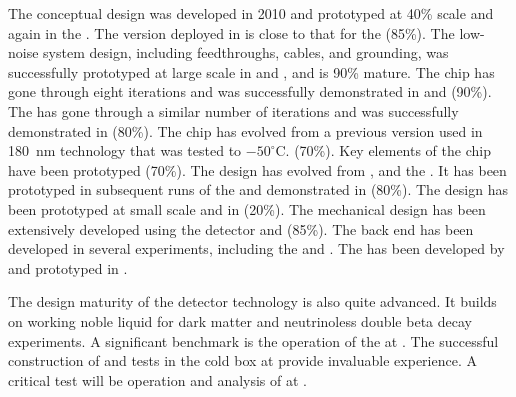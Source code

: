 The  conceptual design was developed in 2010 and prototyped
at 40\% scale and again in the . The version deployed in
 is close to that for the  (85\%). The
 low-noise system design, including feedthroughs, cables, and
grounding, was successfully prototyped at large scale in
 and , and is 90\% mature. The
 chip has gone through eight iterations and was successfully
demonstrated in  and  (90\%). The
 has gone through a similar number of iterations and was
successfully demonstrated in  (80\%). The  chip
has evolved from a previous version used in  180~nm
technology that was tested to $-50^\circ$C. (70\%). Key elements of
the  chip have been prototyped (70\%). The 
design has evolved from ,  and the
.  It has been prototyped in subsequent runs of the
 and demonstrated in  (80\%). The 
 design has been prototyped at small scale and in
 (20\%). The mechanical design has been extensively
developed using the  detector and  (85\%). The
  back end has been developed in several
experiments, including the  and . The
   has been developed by
 and prototyped in .

The design maturity of the  detector technology is also
quite advanced. It builds on working noble liquid  for
dark matter and neutrinoless double beta decay experiments. A
significant benchmark is the operation of the  at
. The successful construction of  and tests in
the cold box at  provide invaluable experience. A critical
test will be operation and analysis of  at
.

